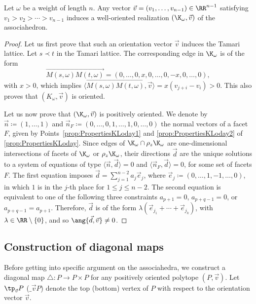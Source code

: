 \begin{proposition}\label{prop:OrientationVector}
Let $\omega$ be a weight of length $n$.
Any vector $\vec v=(v_1, \ldots, v_{n-1})\in \RR^{n-1}$ satisfying $v_1>v_2>\cdots >v_{n-1}$ induces a
well-oriented realization $(\K_\omega, \vec v)$ of the associahedron.
\end{proposition}

\begin{proof}
Let us first prove that such an orientation vector $\vec v$ induces the Tamari lattice.
Let $s\prec t$ in the Tamari lattice. The corresponding edge in $\K_\omega$ is of the form
\[\overrightarrow{M(s,\omega)M(t,\omega)}=(0, \ldots, 0, x, 0, \ldots, 0, -x, 0, \ldots, 0), \]
with $x>0$, which implies
$\big\langle\overrightarrow{M(s,\omega)M(t,\omega)}, \vec v\big\rangle= x(v_{j+i}-v_i)>0$.
This also proves that $(K_\omega,\vec v)$ is oriented.

Let us now prove that $(\K_\omega,\vec v)$ is positively oriented.
We denote by $\vec n\coloneqq (1, \ldots, 1)$ and $\vec n_F\coloneqq (0, \ldots, 0,\allowbreak {1}, \ldots, {1}, 0, \ldots, 0)$ the normal vectors of a facet $F$, given by Points~\eqref{prop:PropertiesKLoday1} and \eqref{prop:PropertiesKLoday2} of \cref{prop:PropertiesKLoday}.
Since edges of $\K_\omega\cap \rho_z \K_\omega$
are one-dimensional intersections of facets of
$\K_\omega$ or $\rho_z \K_\omega$, their directions $\vec d$ are the unique solutions to a system of equations of type $\langle \vec n, \vec d\rangle=0$ and $\langle \vec n_F, \vec d\rangle=0$, for some set of facets $F$.
The first equation imposes $\vec d=\sum_{j=1}^{n-2} a_j \vec e_j$, where
$\vec e_j\coloneqq (0, \ldots, 1, -1, \ldots, 0)$, in which $1$ is in the $j$-th place for $1\leq j\leq n-2$.
The second equation is equivalent to one of the following three constraints
$a_{p+1}=0$, $a_{p+q-1}=0$, or $a_{p+q-1}=a_{p+1}$.
Therefore, $\vec d$ is of the form $\lambda\left(\vec e_{j_1}+\cdots +\vec e_{j_k}\right)$, with $\lambda \in \RR\setminus \{0\}$, and so
$\ang{\vec d, \vec v}\neq 0$.
\end{proof}

\subsection{Construction of diagonal maps}

Before getting into specific argument on the associahedra, we construct a diagonal map $\triangle: P\to P\times P$ for any positively oriented polytope $(P, \vec v)$. Let $\tp_{\vec v} P$ (\resp $\bm_{\vec v} P$) denote the top (\resp bottom) vertex of $P$ with respect to the orientation vector $\vec v$.

